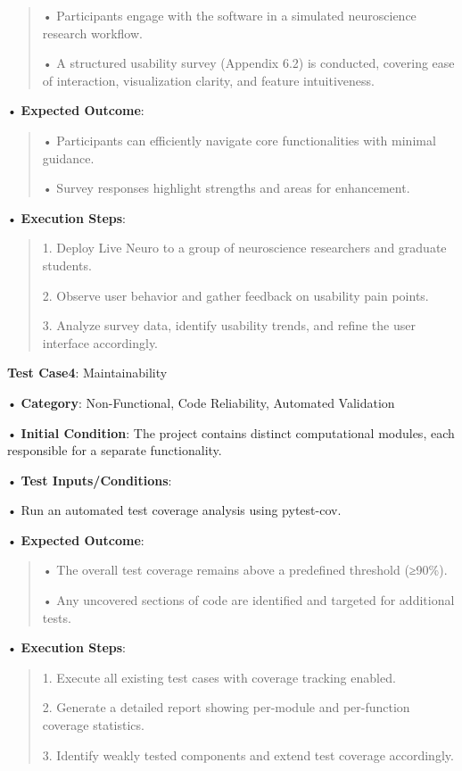 \documentclass[
]{article}
\begin{document}
\begin{quote}
• Participants engage with the software in a simulated neuroscience
research workflow.

• A structured usability survey (Appendix 6.2) is conducted, covering
ease of interaction, visualization clarity, and feature intuitiveness.
\end{quote}

• \textbf{Expected Outcome}:

\begin{quote}
• Participants can efficiently navigate core functionalities with
minimal guidance.

• Survey responses highlight strengths and areas for enhancement.
\end{quote}

• \textbf{Execution Steps}:

\begin{quote}
1. Deploy Live Neuro to a group of neuroscience researchers and graduate
students.

2. Observe user behavior and gather feedback on usability pain points.

3. Analyze survey data, identify usability trends, and refine the user
interface accordingly.
\end{quote}

\textbf{Test Case4}: Maintainability

• \textbf{Category}: Non-Functional, Code Reliability, Automated
Validation

• \textbf{Initial Condition}: The project contains distinct
computational modules, each responsible for a separate functionality.

• \textbf{Test Inputs/Conditions}:

• Run an automated test coverage analysis using pytest-cov.

• \textbf{Expected Outcome}:

\begin{quote}
• The overall test coverage remains above a predefined threshold
(≥90\%).

• Any uncovered sections of code are identified and targeted for
additional tests.
\end{quote}

• \textbf{Execution Steps}:

\begin{quote}
1. Execute all existing test cases with coverage tracking enabled.

2. Generate a detailed report showing per-module and per-function
coverage statistics.

3. Identify weakly tested components and extend test coverage
accordingly.
\end{quote}
\end{document}
